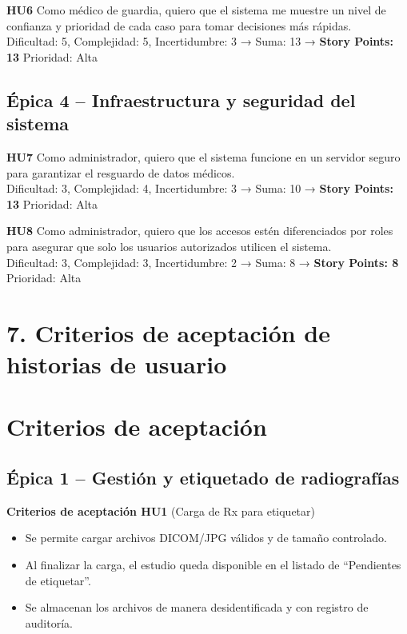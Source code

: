 \documentclass[
11pt, %
]{charter}
\begin{document}
\textbf{HU6}  
Como médico de guardia, quiero que el sistema me muestre un nivel de confianza y prioridad de cada caso para tomar decisiones más rápidas.  
\\Dificultad: 5, Complejidad: 5, Incertidumbre: 3 → Suma: 13 → \textbf{Story Points: 13}  
Prioridad: Alta  

\subsection*{Épica 4 – Infraestructura y seguridad del sistema}

\textbf{HU7}  
Como administrador, quiero que el sistema funcione en un servidor seguro para garantizar el resguardo de datos médicos.  
\\Dificultad: 3, Complejidad: 4, Incertidumbre: 3 → Suma: 10 → \textbf{Story Points: 13}  
Prioridad: Alta  

\textbf{HU8}  
Como administrador, quiero que los accesos estén diferenciados por roles para asegurar que solo los usuarios autorizados utilicen el sistema.  
\\Dificultad: 3, Complejidad: 3, Incertidumbre: 2 → Suma: 8 → \textbf{Story Points: 8}  
Prioridad: Alta  


\section{7. Criterios de aceptación de historias de usuario}
\label{sec:criteriosAceptacion}

\section{Criterios de aceptación}

\subsection*{Épica 1 – Gestión y etiquetado de radiografías}

\textbf{Criterios de aceptación HU1} (Carga de Rx para etiquetar)
\begin{itemize}
  \item Se permite cargar archivos DICOM/JPG válidos y de tamaño controlado.
  \item Al finalizar la carga, el estudio queda disponible en el listado de “Pendientes de etiquetar”.
  \item Se almacenan los archivos de manera desidentificada y con registro de auditoría.
\end{itemize}
\end{document}
